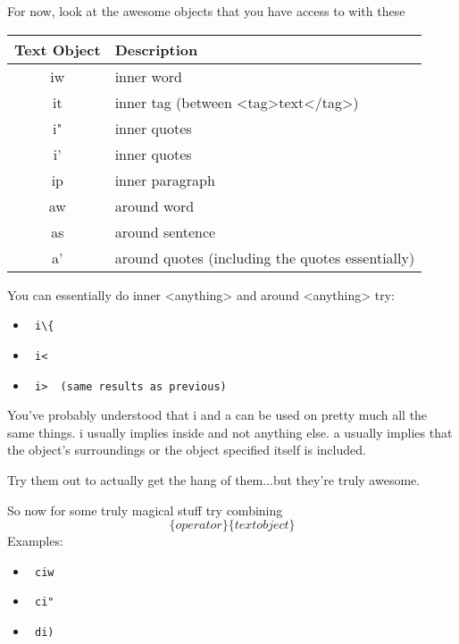\documentclass[12pt, letterpaper]{article}
\begin{document}
For now, look at the awesome objects that you have access to with these
\begin{table}[H]
    \begin{tabular}{|c|l|}
        Text Object & Description \\
        \hline
        iw & inner word \\
        \hline
        it & inner tag (between <tag>text</tag>) \\
        \hline
        i" & inner quotes \\
        \hline
        i' & inner quotes \\
        \hline
        ip & inner paragraph \\
        \hline
        aw & around word \\
        \hline
        as & around sentence \\
        \hline
        a' & around quotes (including the quotes essentially) \\
        \hline
    \end{tabular}
\end{table}

You can essentially do inner <anything> and around <anything>
try:
\begin{itemize}
    \item \begin{verbatim} i\{ \end{verbatim}
    \item \begin{verbatim} i< \end{verbatim}
    \item \begin{verbatim} i>  (same results as previous) \end{verbatim}
\end{itemize}

You've probably understood that i and a can be used on pretty much all the same
things. i usually implies inside and not anything else. a usually implies that
the object's surroundings or the object specified itself is included. 

Try them out to actually get the hang of them...but they're truly awesome.

So now for some truly magical stuff try combining
$$\{operator\}\{text object\}$$
Examples: 
\begin{itemize}
    \item \begin{verbatim} ciw \end{verbatim}
    \item \begin{verbatim} ci" \end{verbatim}
    \item \begin{verbatim} di) \end{verbatim}
\end{itemize}
\end{document}

